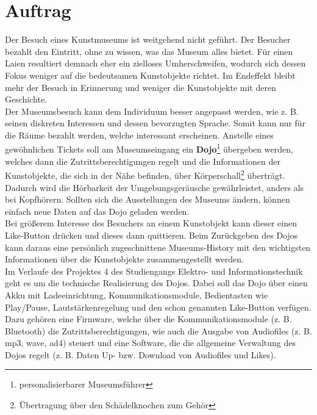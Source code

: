 \chapter{Auftrag}
\thispagestyle{fancy} \setcounter{page}{1} \cfoot{\thepage} \renewcommand{\footrulewidth}{0.4pt} 
Der Besuch eines Kunstmuseums ist weitgehend nicht geführt. Der Besucher bezahlt den Eintritt, ohne zu wissen, was das Museum alles bietet. Für einen Laien resultiert demnach eher ein zielloses Umherschweifen, wodurch sich dessen Fokus weniger auf die bedeutsamen Kunstobjekte richtet. Im Endeffekt bleibt mehr der Besuch in Erinnerung und weniger die Kunstobjekte mit deren Geschichte.
\\[0.5cm]
Der Museumsbesuch kann dem Individuum besser angepasst werden, wie z. B. seinen diskreten Interessen und dessen bevorzugten Sprache. Somit kann nur für die Räume bezahlt werden, welche interessant erscheinen. Anstelle eines gewöhnlichen Tickets soll am Museumseingang ein \textbf{Dojo}\footnote{personalisierbarer Museumsführer} übergeben werden, welches dann die Zutrittsberechtigungen regelt und die Informationen der Kunstobjekte, die sich in der Nähe befinden, über Körperschall\footnote{Übertragung über den Schädelknochen zum Gehör} überträgt. Dadurch wird die Hörbarkeit der Umgebungsgeräusche gewährleistet, anders als bei Kopfhörern. Sollten sich die Ausstellungen des Museums ändern, können einfach neue Daten auf das Dojo geladen werden.
\\[0.5cm]
Bei größerem Interesse des Besuchers an einem Kunstobjekt kann dieser einen \glqq Like-Button\grqq\: drücken und dieses dann quittieren. Beim Zurückgeben des Dojos kann daraus eine persönlich zugeschnittene Museums-History mit den wichtigsten Informationen über die Kunstobjekte zusammengestellt werden.
\\[0.5cm]
Im Verlaufe des Projektes 4 des Studiengangs Elektro- und Informationstechnik geht es um die technische Realisierung des Dojos. Dabei soll das Dojo über einen Akku mit Ladeeinrichtung, Kommunikationsmodule, Bedientasten wie Play/Pause, Lautstärkenregelung und den schon genannten \glqq Like-Button\grqq\: verfügen. Dazu gehören eine Firmware, welche über die Kommunikationsmodule (z. B. Bluetooth) die Zutrittsberechtigungen, wie auch die Ausgabe von Audiofiles (z. B. mp3, wave, ad4) steuert und eine Software, die die allgemeine Verwaltung des Dojos regelt (z. B. Daten Up- bzw. Download von Audiofiles und Likes). 
